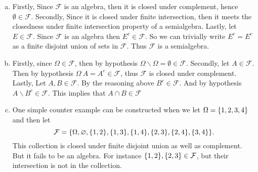 \begin{solution}
	\begin{enumerate}[(a)]
		\item Firstly, Since $ \mathcal{F} $ is an algebra, then it is closed under complement, hence $ \emptyset \in \mathcal{F} $. Secondly, Since it is closed under finite intersection, then it meets the closedness under finite intersection property of a semialgebra. Lastly, let $ E \in \mathcal{F} $. Since $ \mathcal{F} $ is an algebra then $ E^c \in \mathcal{F} $. So we can trivially write $ E^c = E^c $ as a finite disjoint union of sets in $ \mathcal{F} $. Thus $ \mathcal{F} $ is a semialgebra.
		\item Firstly, since $ \Omega \in \mathcal{F} $, then by hypothesis $ \Omega \backslash \Omega = \emptyset \in \mathcal{F} $. Secondly, let $ A \in \mathcal{F} $. Then by hypothesis $ \Omega \ A = A^c \in \mathcal{F} $, thus $ \mathcal{F} $ is closed under complement. Lastly, Let $ A,B \in \mathcal{F} $. By the reasoning above $ B^c \in \mathcal{F} $. And by hypothesis $ A\backslash B^c \in \mathcal{F} $. This implies that $ A \cap B \in \mathcal{F} $
		\item One simple counter example can be constructed when we let $ \Omega = \{1,2,3,4\} $ and then let 
		\[ \mathcal{F} = \{\Omega,\varnothing, \{1,2\},\{1,3\},\{1,4\},\{2,3\},\{2,4\},\{3,4\}\}. \]
		This collection is closed under finite disjoint union as well as complement. But it fails to be an algebra. For instance $ \{1,2\},\{2,3\} \in \mathcal{F} $, but their intersection is not in the collection.
	\end{enumerate}
\end{solution}

